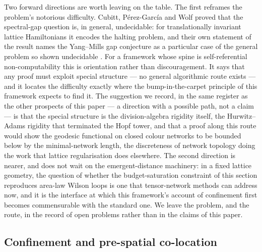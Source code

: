 Two forward directions are worth leaving on the table. The first reframes the problem's notorious
difficulty. Cubitt, P\'{e}rez-Garc\'{i}a and Wolf proved that the spectral-gap question is, in
general, undecidable: for translationally invariant lattice Hamiltonians it encodes the halting
problem, and their own statement of the result names the Yang--Mills gap conjecture as a particular
case of the general problem so shown undecidable \autocite{cubitt2015spectralgap}. For a framework
whose spine is self-referential non-computability this is orientation rather than discouragement.
It says that any proof must exploit special structure --- no general algorithmic route exists ---
and it locates the difficulty exactly where the bump-in-the-carpet principle of this framework
expects to find it. The suggestion we record, in the same register as the other prospects of this
paper --- a direction with a possible path, not a claim --- is that the special structure is the
division-algebra rigidity itself, the Hurwitz--Adams rigidity that terminated the Hopf tower, and
that a proof along this route would show the geodesic functional on closed colour networks to be
bounded below by the minimal-network length, the discreteness of network topology doing the work
that lattice regularisation does elsewhere. The second direction is nearer, and does not wait on the
emergent-distance machinery: in a fixed lattice geometry, the question of whether the
budget-saturation constraint of this section reproduces area-law Wilson loops is one that
tensor-network methods can address now, and it is the interface at which this framework's account of
confinement first becomes commensurable with the standard one. We leave the problem, and the route,
in the record of open problems rather than in the claims of this paper.

\subsection{Confinement and pre-spatial co-location}

